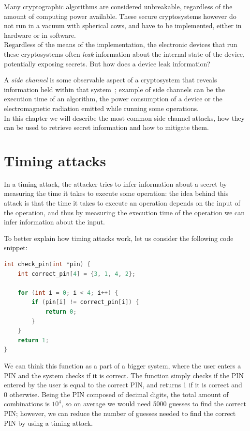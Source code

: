 Many cryptographic algorithms are considered unbreakable, regardless of the amount of computing power available.
These secure cryptosystems however do not run in a vacuum with spherical cows, and have to be implemented, either in
hardware or in software.\\
Regardless of the means of the implementation, the electronic devices that run these cryptosystems often
\textit{leak} information about the internal state of the device, potentially exposing secrets.
But how does a device leak information?

A \textit{side channel} is some observable aspect of a cryptosystem that reveals information held within that system~\cite{standaert2010introduction};
example of side channels can be the execution time of an algorithm, the power consumption of a device or the electromagnetic
radiation emitted while running some operations.\\
In this chapter we will describe the most common side channel attacks, how they can be used to retrieve secret information and
how to mitigate them.

\section{Timing attacks}
In a timing attack, the attacker tries to infer information about a secret by measuring the time it takes to execute some operation:
the idea behind this attack is that the time it takes to execute an operation depends on the input of the operation, and thus
by measuring the execution time of the operation we can infer information about the input.

To better explain how timing attacks work, let us consider the following code snippet:
\begin{lstlisting}[language=C]
int check_pin(int *pin) {
    int correct_pin[4] = {3, 1, 4, 2};

    for (int i = 0; i < 4; i++) {
        if (pin[i] != correct_pin[i]) {
            return 0;
        }
    }
    return 1;
}
\end{lstlisting}
We can think this function as a part of a bigger system, where the user enters a PIN and the system checks if it is correct.
The function simply checks if the PIN entered by the user is equal to the correct PIN, and returns 1 if it is correct and 0 otherwise.
Being the PIN composed of decimal digits, the total amount of combinations is $10^4$, so on average we would need 5000 guesses to find
the correct PIN; however, we can reduce the number of guesses needed to find the correct PIN by using a timing attack.

